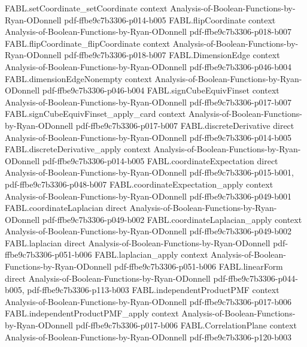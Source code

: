 \begin{theorem}
\proofstep
  {FABL.setCoordinate_setCoordinate}
  {context}
  {Analysis-of-Boolean-Functions-by-Ryan-ODonnell}
  {pdf-ffbe9c7b3306-p014-b005}
\proofstep
  {FABL.flipCoordinate}
  {context}
  {Analysis-of-Boolean-Functions-by-Ryan-ODonnell}
  {pdf-ffbe9c7b3306-p018-b007}
\proofstep
  {FABL.flipCoordinate_flipCoordinate}
  {context}
  {Analysis-of-Boolean-Functions-by-Ryan-ODonnell}
  {pdf-ffbe9c7b3306-p018-b007}
\proofstep
  {FABL.DimensionEdge}
  {context}
  {Analysis-of-Boolean-Functions-by-Ryan-ODonnell}
  {pdf-ffbe9c7b3306-p046-b004}
\proofstep
  {FABL.dimensionEdgeNonempty}
  {context}
  {Analysis-of-Boolean-Functions-by-Ryan-ODonnell}
  {pdf-ffbe9c7b3306-p046-b004}
\proofstep
  {FABL.signCubeEquivFinset}
  {context}
  {Analysis-of-Boolean-Functions-by-Ryan-ODonnell}
  {pdf-ffbe9c7b3306-p017-b007}
\proofstep
  {FABL.signCubeEquivFinset_apply_card}
  {context}
  {Analysis-of-Boolean-Functions-by-Ryan-ODonnell}
  {pdf-ffbe9c7b3306-p017-b007}
\proofstep
  {FABL.discreteDerivative}
  {direct}
  {Analysis-of-Boolean-Functions-by-Ryan-ODonnell}
  {pdf-ffbe9c7b3306-p014-b005}
\proofstep
  {FABL.discreteDerivative_apply}
  {context}
  {Analysis-of-Boolean-Functions-by-Ryan-ODonnell}
  {pdf-ffbe9c7b3306-p014-b005}
\proofstep
  {FABL.coordinateExpectation}
  {direct}
  {Analysis-of-Boolean-Functions-by-Ryan-ODonnell}
  {pdf-ffbe9c7b3306-p015-b001,
    pdf-ffbe9c7b3306-p048-b007}
\proofstep
  {FABL.coordinateExpectation_apply}
  {context}
  {Analysis-of-Boolean-Functions-by-Ryan-ODonnell}
  {pdf-ffbe9c7b3306-p049-b001}
\proofstep
  {FABL.coordinateLaplacian}
  {direct}
  {Analysis-of-Boolean-Functions-by-Ryan-ODonnell}
  {pdf-ffbe9c7b3306-p049-b002}
\proofstep
  {FABL.coordinateLaplacian_apply}
  {context}
  {Analysis-of-Boolean-Functions-by-Ryan-ODonnell}
  {pdf-ffbe9c7b3306-p049-b002}
\proofstep
  {FABL.laplacian}
  {direct}
  {Analysis-of-Boolean-Functions-by-Ryan-ODonnell}
  {pdf-ffbe9c7b3306-p051-b006}
\proofstep
  {FABL.laplacian_apply}
  {context}
  {Analysis-of-Boolean-Functions-by-Ryan-ODonnell}
  {pdf-ffbe9c7b3306-p051-b006}
\proofstep
  {FABL.linearForm}
  {direct}
  {Analysis-of-Boolean-Functions-by-Ryan-ODonnell}
  {pdf-ffbe9c7b3306-p044-b005,
    pdf-ffbe9c7b3306-p113-b003}
\proofstep
  {FABL.independentProductPMF}
  {context}
  {Analysis-of-Boolean-Functions-by-Ryan-ODonnell}
  {pdf-ffbe9c7b3306-p017-b006}
\proofstep
  {FABL.independentProductPMF_apply}
  {context}
  {Analysis-of-Boolean-Functions-by-Ryan-ODonnell}
  {pdf-ffbe9c7b3306-p017-b006}
\proofstep
  {FABL.CorrelationPlane}
  {context}
  {Analysis-of-Boolean-Functions-by-Ryan-ODonnell}
  {pdf-ffbe9c7b3306-p120-b003}

\end{theorem}
